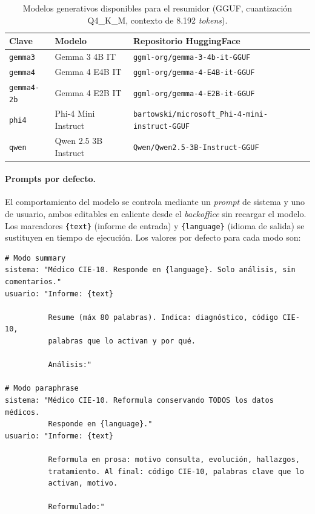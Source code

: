 \begin{table}[ht]
\centering
\small
\caption{Modelos generativos disponibles para el resumidor (GGUF, cuantización Q4\_K\_M, contexto de 8.192 \emph{tokens}).}
\label{tab:summarizer-modelos}
\begin{tabular}{lll}
\hline
\textbf{Clave} & \textbf{Modelo} & \textbf{Repositorio HuggingFace} \\
\hline
\texttt{gemma3}    & Gemma 3 4B IT       & \texttt{ggml-org/gemma-3-4b-it-GGUF} \\
\texttt{gemma4}    & Gemma 4 E4B IT      & \texttt{ggml-org/gemma-4-E4B-it-GGUF} \\
\texttt{gemma4-2b} & Gemma 4 E2B IT      & \texttt{ggml-org/gemma-4-E2B-it-GGUF} \\
\texttt{phi4}      & Phi-4 Mini Instruct & \texttt{bartowski/microsoft\_Phi-4-mini-instruct-GGUF} \\
\texttt{qwen}      & Qwen 2.5 3B Instruct & \texttt{Qwen/Qwen2.5-3B-Instruct-GGUF} \\
\hline
\end{tabular}
\end{table}

\paragraph{Prompts por defecto.} El comportamiento del modelo se controla mediante un \emph{prompt} de sistema y uno de usuario, ambos editables en caliente desde el \emph{backoffice} sin recargar el modelo. Los marcadores \texttt{\{text\}} (informe de entrada) y \texttt{\{language\}} (idioma de salida) se sustituyen en tiempo de ejecución. Los valores por defecto para cada modo son:

{\small
\begin{verbatim}
# Modo summary
sistema: "Médico CIE-10. Responde en {language}. Solo análisis, sin comentarios."
usuario: "Informe: {text}

          Resume (máx 80 palabras). Indica: diagnóstico, código CIE-10,
          palabras que lo activan y por qué.

          Análisis:"

# Modo paraphrase
sistema: "Médico CIE-10. Reformula conservando TODOS los datos médicos.
          Responde en {language}."
usuario: "Informe: {text}

          Reformula en prosa: motivo consulta, evolución, hallazgos,
          tratamiento. Al final: código CIE-10, palabras clave que lo
          activan, motivo.

          Reformulado:"
\end{verbatim}
}


